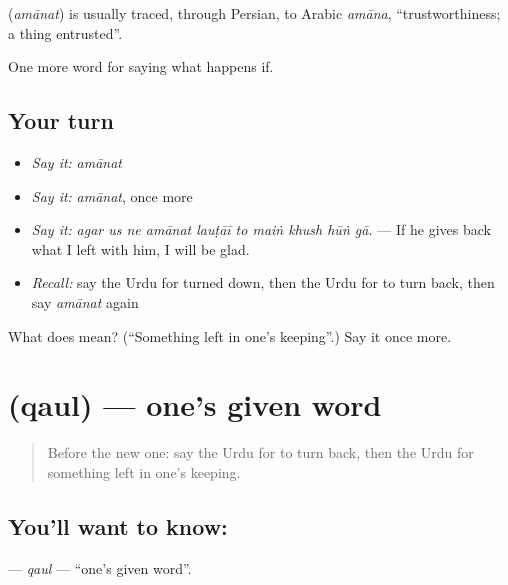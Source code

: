 \begin{cousinweb}
\textbf{} (\emph{amānat}) is usually traced, through Persian, to Arabic \emph{amāna}, \textquotedblleft{}trustworthiness; a thing entrusted\textquotedblright{}.
\end{cousinweb}

\begin{grammarlens}[title={What you've built}]
One more word for saying what happens if.
\end{grammarlens}

\subsection*{Your turn}
\begin{itemize}
\raggedright
  \item \emph{Say it:} \emph{amānat}
  \item \emph{Say it:} \emph{amānat}, once more
  \item \emph{Say it:} \emph{agar us ne amānat lauṭāī to maiṅ khush hūṅ gā.} — If he gives back what I left with him, I will be glad.
  \item \emph{Recall:} say the Urdu for turned down, then the Urdu for to turn back, then say \emph{amānat} again
\end{itemize}

\begin{tcolorbox}[breakable,colback=teal!4,colframe=teal!35!black,title={Before you move on}]
What does  mean? (\textquotedblleft{}Something left in one's keeping\textquotedblright{}.) Say it once more.
\end{tcolorbox}
\section[\texorpdfstring{\ur{قول} (qaul)}{قول (qaul)}]{ (qaul) — one's given word}

\label{lesson:UR-C531-qaul}



\begin{quote}
Before the new one: say the Urdu for to turn back, then the Urdu for something left in one's keeping.
\end{quote}

\subsection*{You'll want to know: }
\textbf{} — \emph{qaul} — \textquotedblleft{}one's given word\textquotedblright{}.


